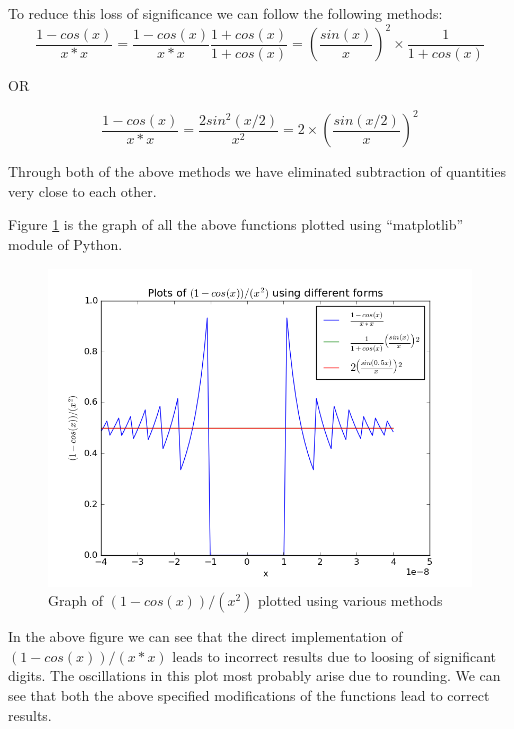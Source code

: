 \documentclass[11pt, a4paper]{article}
\begin{document}
To reduce this loss of significance we can follow the following methods:
\begin{equation}
 \frac{1 - cos(x)}{x*x} = \frac{1 - cos(x)}{x*x}\frac{1 + cos(x)}{1 + cos(x)} = \left(\frac{sin(x)}{x}\right)^2 \times
 \frac{1}{1 + cos(x)}
\end{equation}

\begin{center}
 OR
\end{center}

\begin{equation}
 \frac{1 - cos(x)}{x*x} = \frac{2sin^2(x/2)}{x^2} = 2\times\left(\frac{sin(x/2)}{x}\right)^2
\end{equation}

Through both of the above methods we have eliminated subtraction of quantities very close to each other.

Figure \ref{fig:Q3} is the graph of all the above functions plotted using ``matplotlib'' module of Python.

\begin{figure}[H]
 \centering
 \includegraphics[width = \textwidth]{Q3.png}
 \caption{Graph of $(1 - cos(x))/(x^2)$ plotted using various methods}
 \label{fig:Q3}
\end{figure}

In the above figure we can see that the direct implementation of $(1 - cos(x))/(x*x)$ leads to incorrect results due to loosing
 of significant digits. The oscillations in this plot most probably arise due to rounding. We can see that both the above 
specified modifications of the functions lead to correct results.
\end{document}
